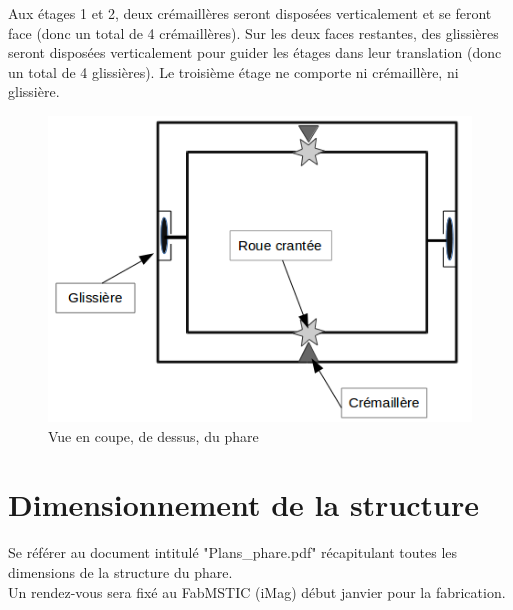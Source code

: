 \documentclass{article}
\begin{document}
\pagebreak

Aux étages 1 et 2, deux crémaillères seront disposées verticalement et se feront face (donc un total de 4
crémaillères). Sur les deux faces restantes, des glissières seront disposées verticalement pour guider les
étages dans leur translation (donc un total de 4 glissières). Le troisième étage ne comporte ni crémaillère,
ni glissière.


\begin{figure}[!h]
\centering
\includegraphics[scale=0.7]{Pictures/Schema_phare2.png}
\caption{Vue en coupe, de dessus, du phare}
\end{figure}


\section{Dimensionnement de la structure}
Se référer au document intitulé "Plans\_phare.pdf" récapitulant toutes les dimensions de la structure
du phare. \\
Un rendez-vous sera fixé au FabMSTIC (iMag) début janvier pour la fabrication.
\end{document}
